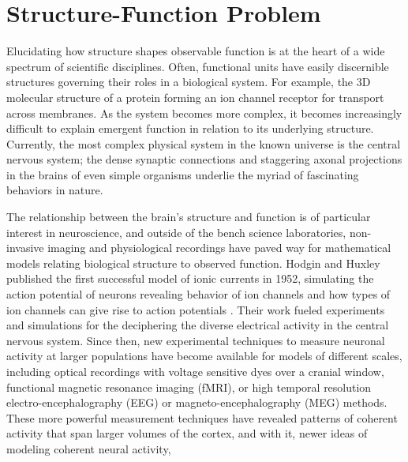 \section{Structure-Function Problem}
Elucidating how structure shapes observable function is at the heart of a wide spectrum of scientific disciplines. Often, functional units have easily discernible structures governing their roles in a biological system. For example, the 3D molecular structure of a protein forming an ion channel receptor for transport across membranes. As the system becomes more complex, it becomes increasingly difficult to explain emergent function in relation to its underlying structure. Currently, the most complex physical system in the known universe is the central nervous system; the dense synaptic connections and staggering axonal projections in the brains of even simple organisms underlie the myriad of fascinating behaviors in nature.

The relationship between the brain's structure and function is of particular interest in neuroscience, and outside of the bench science laboratories, non-invasive imaging and physiological recordings have paved way for mathematical models relating biological structure to observed function. Hodgin and Huxley published the first successful model of ionic currents in 1952, simulating the action potential of neurons revealing behavior of ion channels and how types of ion channels can give rise to action potentials \cite{hodgkin_quantitative_1952}. Their work fueled experiments and simulations for the deciphering the diverse electrical activity in the central nervous system. Since then, new experimental techniques to measure neuronal activity at larger populations have become available for models of different scales, including optical recordings with voltage sensitive dyes over a cranial window, functional magnetic resonance imaging (fMRI), or high temporal resolution electro-encephalography (EEG) or magneto-encephalography (MEG) methods. These more powerful measurement techniques have revealed patterns of coherent activity that span larger volumes of the cortex, and with it, newer ideas of modeling coherent neural activity,



